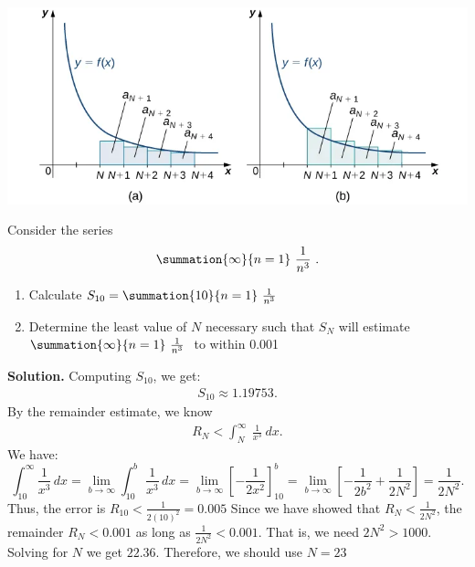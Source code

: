 \documentclass{report}
\begin{document}
    \pagebreak \bigbreak \noindent 
    \begin{center}
        \includegraphics[scale=0.5]{./figures/mane11.png}
    \end{center}
    \bigbreak \noindent 
    \begin{eg}
        Consider the series 
        \begin{align*}
            \summation{\infty}{n=1}\ \frac{1}{n^{3}}\ 
        .\end{align*}
        \begin{enumerate}[label=(\alph*)]
            \item Calculate $S_{10} = \summation{10}{n=1}\ \frac{1}{n^{3}}\ $
            \item Determine the least value of  $N$ necessary such that  $S_{N} $ will estimate  $\summation{\infty}{n=1}\ \frac{1}{n^{3}}\  $ to within 0.001
        \end{enumerate}
    \end{eg}
    \bigbreak \noindent 
    \textbf{Solution.} Computing $S_{10}$, we get:
    \begin{align*}
        S_{10} \approx 1.19753
    .\end{align*}
    \bigbreak \noindent 
    By the remainder estimate, we know
    \begin{align*}
        R_{N} < \int_{N}^{\infty}\ \frac{1}{x^{3}}\ dx
    .\end{align*}
    \bigbreak \noindent 
    We have:
    \[
        \int_{10}^{\infty} \frac{1}{x^3} \, dx = \lim_{b \to \infty} \int_{10}^{b} \frac{1}{x^3} \, dx = \lim_{b \to \infty} \left[ -\frac{1}{2x^2} \right]_{10}^{b} = \lim_{b \to \infty} \left[ -\frac{1}{2b^2} + \frac{1}{2N^{2}} \right] = \frac{1}{2N^{2}}.
    \]
    \bigbreak \noindent 
    Thus, the error is $R_{10}  < \frac{1}{2(10)^{2}} = 0.005$
    \bigbreak \noindent 
    Since we have showed that $R_{N} < \frac{1}{2N^{2}}$, the remainder $R_{N} < 0.001$ as long as $\frac{1}{2N^{2}} < 0.001 $. That is, we need $2N^{2} > 1000$. Solving for $N$ we get $22.36$. Therefore, we should use $N=23$
\end{document}
